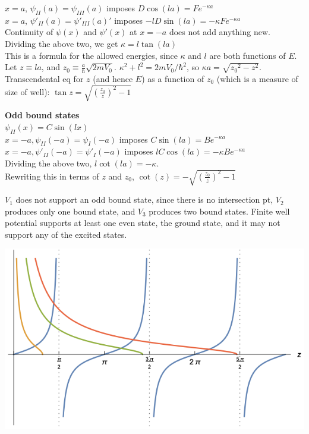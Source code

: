$x = a$, $\psi_{II}(a) = \psi_{III}(a)$ imposes $D \cos(la) = F e^{-\kappa a}$ \\

$x = a$, $\psi'_{II}(a) = \psi'_{III}(a)'$ imposes $-lD \sin(la) = -\kappa F e^{-\kappa a}$ \\

Continuity of $\psi(x)$ and $\psi'(x)$ at $x = -a$ does not add anything new. \\

Dividing the above two, we get $\kappa = l \tan(la)$ \\
This is a formula for the allowed energies, since $\kappa$ and $l$ are both functions of $E$. Let $z \equiv la$, and $z_0 \equiv \frac{a}{\hbar} \sqrt{2m V_0}$. $\kappa^2 + l^2 = 2m V_0 / \hbar^2$, so $\kappa a = \sqrt{{z_0}^2 - z^2}$. \\

Transcendental eq for $z$ (and hence $E$) as a function of $z_0$ (which is a measure of size of well): $\tan z = \sqrt{(\frac{z_0}{z})^2 - 1}$

\textbf{Odd bound states} \\
$\psi_{II}(x) = C \sin(lx)$ \\

$x = -a, \psi_{II}(-a) = \psi_{I}(-a)$ imposes $C \sin(la) = B e^{-\kappa a}$ \\
$x = -a, \psi'_{II}(-a) = \psi'_{I}(-a)$ imposes $l C \cos(la) = -\kappa B e^{-\kappa a}$ \\

Dividing the above two, $l \cot(la) = -\kappa$. \\
Rewriting this in terms of $z$ and $z_0$, $\cot(z) = - \sqrt{(\frac{z_0}{z})^2 - 1}$

$V_{1}$ does not support an odd bound state, since there is no intersection pt, $V_{2}$ produces only one bound state, and $V_{3}$ produces two bound states. Finite well potential supports at least one even state, the ground state, and it may not support any of the excited states.

\vspace{0em}
\begin{Figure}
    \raggedright
    \includegraphics[width=0.4\columnwidth]{figures/even_finite_square_well.png}
\end{Figure}
\vspace{-1em}

